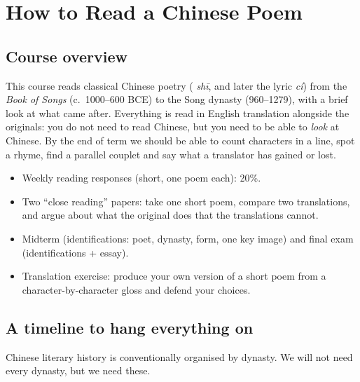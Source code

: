 \chapter{How to Read a Chinese Poem}

\section{Course overview}

This course reads classical Chinese poetry ( \emph{shī}, and later the lyric
 \emph{cí}) from the \emph{Book of Songs} (c.\ 1000--600 BCE) to the Song dynasty
(960--1279), with a brief look at what came after. Everything is read in English
translation alongside the originals: you do not need to read Chinese, but you need to
be able to \emph{look} at Chinese.
By the end of term we should be able to count characters in a line, spot a rhyme, find a
parallel couplet and say what a translator has gained or lost.

\begin{important}
\begin{itemize}
  \item Weekly reading responses (short, one poem each): 20\%.
  \item Two ``close reading'' papers: take one short poem, compare two translations, and
        argue about what the original does that the translations cannot.
  \item Midterm (identifications: poet, dynasty, form, one key image) and final exam
        (identifications + essay).
  \item Translation exercise: produce your own version of a short poem from a
        character-by-character gloss and defend your choices.
\end{itemize}
\end{important}

\section{A timeline to hang everything on}

Chinese literary history is conventionally organised by dynasty. We will not need every
dynasty, but we need these.

